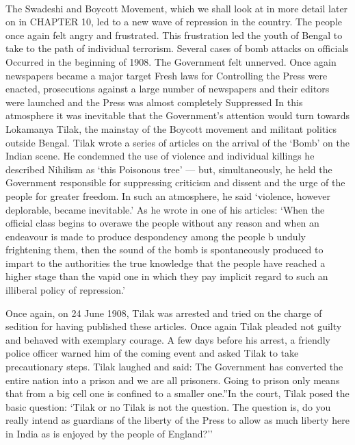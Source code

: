 \paragraph*{}
The Swadeshi and Boycott Movement, which we shall look at in more detail later on in CHAPTER 10, led to a new wave of repression in the country. The people once again felt angry and frustrated. This frustration led the youth of Bengal to take to the path of individual terrorism. Several cases of bomb attacks on officials Occurred in the beginning of 1908. The Government felt unnerved. Once again newspapers became a major target Fresh laws for Controlling the Press were enacted, prosecutions against a large number of newspapers and their editors were launched and the Press was almost completely Suppressed In this atmosphere it was inevitable that the Government's attention would turn towards Lokamanya Tilak, the mainstay of the Boycott movement and militant politics outside Bengal. Tilak wrote a series of articles on the arrival of the `Bomb' on the Indian scene. He condemned the use of violence and individual killings he described Nihilism as `this Poisonous tree' — but, simultaneously, he held the Government responsible for suppressing criticism and dissent and the urge of the people for greater freedom. In such an atmosphere, he said `violence, however deplorable, became inevitable.' As he wrote in one of his articles: `When the official class begins to overawe the people without any reason and when an endeavour is made to produce despondency among the people b unduly frightening them, then the sound of the bomb is spontaneously produced to impart to the authorities the true knowledge that the people have reached a higher stage than the vapid one in which they pay implicit regard to such an illiberal policy of repression.'

Once again, on 24 June 1908, Tilak was arrested and tried on the charge of sedition for having published these articles. Once again Tilak pleaded not guilty and behaved with exemplary courage. A few days before his arrest, a friendly police officer warned him of the coming event and asked Tilak to take precautionary steps. Tilak laughed and said: The Government has converted the entire nation into a prison and we are all prisoners. Going to prison only means that from a big cell one is confined to a smaller one.''In the court, Tilak posed the basic question: `Tilak or no Tilak is not the question. The question is, do you really intend as guardians of the liberty of the Press to allow as much liberty here in India as is enjoyed by the people of England?''

